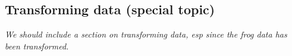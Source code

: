 \begin{doublespace}
\subsection{Transforming data (special topic)}

\textit{We should include a section on transforming data, esp since the frog data has been transformed.}

\end{doublespace}
